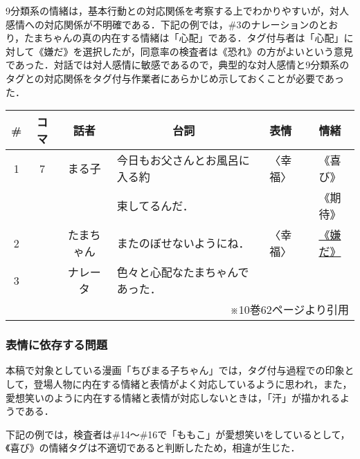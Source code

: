 \documentclass[japanese]{jnlp_1.3c}
\begin{document}
9分類系の情緒は，基本行動との対応関係を考察する上でわかりやすいが，対人感情への対応関係が不明確である．下記の例では，\#3のナレーションのとおり，たまちゃんの真の内在する情緒は「心配」である．タグ付与者は「心配」に対して《嫌だ》を選択したが，同意率の検査者は《恐れ》の方がよいという意見であった．対話では対人感情に敏感であるので，典型的な対人感情と9分類系のタグとの対応関係をタグ付与作業者にあらかじめ示しておくことが必要であった．

\vspace{\baselineskip}
\begin{center}
\begin{tabular}{|c|c|c|l|c|c|}
\hline
\# & コマ & 話者 & \multicolumn{1}{|c|}{台詞} & 表情 & 情緒 \\
\hline
1 & 7 & まる子     & 今日もお父さんとお風呂に入る約  & 〈幸福〉 & 《喜び》\\
  &   &            & 束してるんだ．                  &          & 《期待》\\
\cline{1-1} \cline{3-6}
2 &   & たまちゃん & またのぼせないようにね．        & 〈幸福〉 & \underline{《嫌だ》} \\
\cline{1-1} \cline{3-6}
3 &   & ナレータ   & 色々と心配なたまちゃんであった．&          & \\
\hline
\multicolumn{6}{r}{※10巻62ページより引用}
\end{tabular}
\end{center}

    \subsubsection{表情に依存する問題}

本稿で対象としている漫画「ちびまる子ちゃん」では，タグ付与過程での印象として，登場人物に内在する情緒と表情がよく対応しているように思われ，また，愛想笑いのように内在する情緒と表情が対応しないときは，「汗」が描かれるようである．

下記の例では，検査者は\#14〜\#16で「ももこ」が愛想笑いをしているとして，《喜び》の情緒タグは不適切であると判断したため，相違が生じた．
\end{document}
